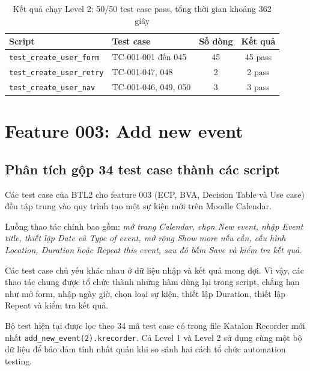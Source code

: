 \documentclass[12pt,a4paper]{article}
\begin{document}
\begin{table}[H]
\centering\small
\begin{tabular}{|L{5.0cm}|L{3.6cm}|c|c|}
\hline
{}\textbf{Script} & \textbf{Test case} & \textbf{Số dòng} & \textbf{Kết quả} \\ \hline
\texttt{test\_create\_user\_form} & TC-001-001 đến 045 & 45 & 45 pass \\ \hline
\texttt{test\_create\_user\_retry} & TC-001-047, 048 & 2 & 2 pass \\ \hline
\texttt{test\_create\_user\_nav} & TC-001-046, 049, 050 & 3 & 3 pass \\ \hline
\end{tabular}
\caption{Kết quả chạy Level 2: 50/50 test case pass, tổng thời gian khoảng 362 giây}
\end{table}



\section{Feature 003: Add new event}
\subsection{Phân tích gộp 34 test case thành các script}

Các test case của BTL2 cho feature 003 (ECP, BVA, Decision Table và Use case) đều tập trung vào quy trình tạo một sự kiện mới trên Moodle Calendar.

Luồng thao tác chính bao gồm:
\emph{mở trang Calendar, chọn New event, nhập Event title, thiết lập Date và Type of event, mở rộng Show more nếu cần, cấu hình Location, Duration hoặc Repeat this event, sau đó bấm Save và kiểm tra kết quả}.

Các test case chủ yếu khác nhau ở dữ liệu nhập và kết quả mong đợi. Vì vậy, các thao tác chung được tổ chức thành những hàm dùng lại trong script, chẳng hạn như mở form, nhập ngày giờ, chọn loại sự kiện, thiết lập Duration, thiết lập Repeat và kiểm tra kết quả.

Bộ test hiện tại được lọc theo 34 mã test case có trong file Katalon Recorder mới nhất \texttt{add\_new\_event(2).krecorder}. Cả Level 1 và Level 2 sử dụng cùng một bộ dữ liệu để bảo đảm tính nhất quán khi so sánh hai cách tổ chức automation testing.
\end{document}
